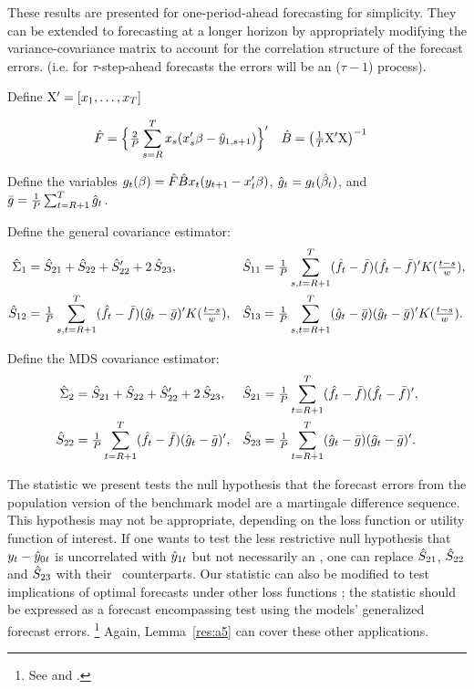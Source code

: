\documentclass[12pt,fleqn]{article}
\begin{document}
\begin{rem}
  These results are presented for one-period-ahead forecasting for
  simplicity.  They can be extended to forecasting at a longer horizon
  by appropriately modifying the variance-covariance matrix to account
  for the correlation structure of the forecast errors. (i.e. for
  $\tau$-step-ahead forecasts the errors will be an \ma($\tau-1$) process).
\end{rem}

Define $\mathrm{X}' = [x_1,\dots,x_T]$

\begin{align*}
  \hat{F} &= \Big\{\tfrac{2}{P}\sum_{s=R}^T x_s (x_s'\beta - \hat{y}_{1,s+1}) \Big\}' &
  \hat{B} &= \big(\tfrac1T \mathrm{X}'\mathrm{X} \big)^{-1}
\end{align*}

Define the variables
$g_t(\beta) = \hat{F} \hat{B} x_t(y_{t+1} - x_t'\beta)$,
$\hat{g}_t = g_t(\hat{\beta}_t)$, and $\bar{g} = \tfrac{1}{P} \sum_{t=R+1}^T \hat{g}_t$.

\newcommand{\K}[1]{K(\tfrac{#1}{w})}

Define the general covariance estimator:
\begin{align*}
  \Sigmah_1 &= \Sh_{21} + \Sh_{22} + \Sh_{22}' + 2 \, \Sh_{23}, &
  \Sh_{11} &= \oavg{s,t} (\fh_t - \fb) (\fh_t - \fb)' \K{t-s}, \\
  \Sh_{12} &= \oavg{s,t} (\fh_t - \fb)(\gh_t - \gb)' \K{t-s}, &
  \Sh_{13} &= \oavg{s,t} (\gh_t - \gb)(\gh_t - \gb)'  \K{t-s}.
\end{align*}

Define the MDS covariance estimator:
\begin{align*}
  \hat\Sigma_2 &= \hat{S}_{21} + \hat{S}_{22} + \hat{S}_{22}' + 2 \, \hat{S}_{23}, &
  \hat{S}_{21} &= \tfrac{1}{P} \sum_{t=R+1}^T (\hat{f}_t - \bar{f}) (\hat{f}_t - \bar{f})', \\
  \hat{S}_{22} &= \tfrac{1}{P} \sum_{t=R+1}^T (\hat{f}_t - \bar{f})(\hat{g}_t - \bar{g})', &
  \hat{S}_{23} &= \tfrac{1}{P} \sum_{t=R+1}^T (\hat{g}_t - \bar{g})(\hat{g}_t - \bar{g})'.
\end{align*}

\begin{lem}\label{lem:2}\end{lem}

\begin{rem}
  The statistic we present tests the null hypothesis that the forecast
  errors from the population version of the benchmark model are a
  martingale difference sequence.  This hypothesis may not be
  appropriate, depending on the loss function or utility function of
  interest.  If one wants to test the less restrictive null hypothesis that
  $y_{t} - \hat{y}_{0t}$ is uncorrelated with $\hat{y}_{1t}$ but not
  necessarily an \mds, one can replace $\hat{S}_{21}$, $\hat{S}_{22}$
  and $\hat{S}_{23}$ with their \hac\ counterparts.
  Our statistic can also be modified to test implications of
  optimal forecasts under other loss functions
  \citep[see][]{PaT:07,PaT:07b}; the statistic should be expressed as
  a forecast encompassing test using the models' generalized forecast
  errors.%
\footnote{See \citet{HLN:98} and \citet[Section~4]{ClW:07}.} %
  Again, Lemma~\ref{res:a5} can cover these other applications.
\end{rem}
\end{document}
